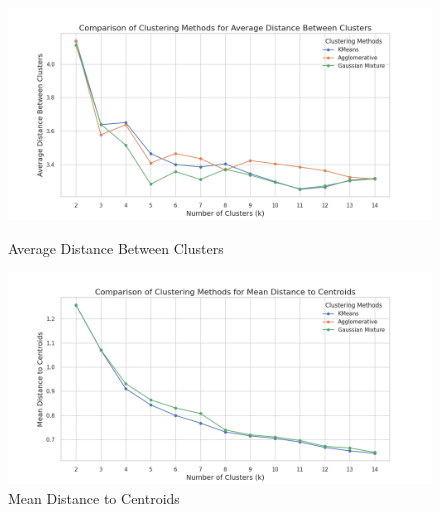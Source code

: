 \documentclass{article}
\begin{document}
\begin{figure}[H]
	\centering
	\begin{minipage}{0.45\textwidth}
		\centering
		\includegraphics[width=\textwidth]{images/clustering_Average Distance Between Clusters.png}
		\caption{Average Distance Between Clusters}
		\label{fig:average_distance}
	\end{minipage}\hfill
	\begin{minipage}{0.45\textwidth}
		\centering
		\includegraphics[width=\textwidth]{images/clustering_Mean Distance to Centroids.png}
		\caption{Mean Distance to Centroids}
		\label{fig:mean_distance}
	\end{minipage}
	
	\vspace{0.5cm} %
	

\end{figure}
\end{document}
